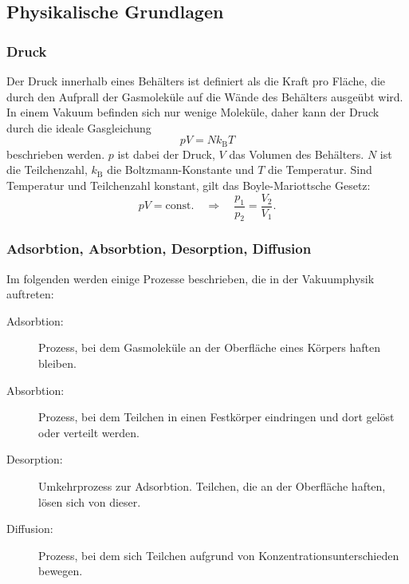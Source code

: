 \subsection{Physikalische Grundlagen}
\subsubsection{Druck}
Der Druck innerhalb eines Behälters ist definiert als die Kraft pro Fläche, die durch den Aufprall
der Gasmoleküle auf die Wände des Behälters ausgeübt wird. In einem Vakuum befinden sich nur wenige Moleküle, daher kann der Druck durch die ideale Gasgleichung
\begin{equation}
    \label{eq:id_gasgleichung}
    pV = N k_{\text{B}} T
\end{equation}
beschrieben werden. $p$ ist dabei der Druck, $V$ das Volumen des Behälters. $N$ ist die Teilchenzahl, $k_{\text{B}}$ die Boltzmann-Konstante und $T$ die Temperatur.
Sind Temperatur und Teilchenzahl konstant, gilt das Boyle-Mariottsche Gesetz:
\begin{equation}
    \label{eq:boyle_mariott}
    pV = \text{const.} \quad \Rightarrow \quad \frac{p_1}{p_2} = \frac{V_2}{V_1} .
\end{equation}
\cite{V070_glossar}
\subsubsection{Adsorbtion, Absorbtion, Desorption, Diffusion}
Im folgenden werden einige Prozesse beschrieben, die in der Vakuumphysik auftreten:
\begin{description}
    \item[Adsorbtion:] Prozess, bei dem Gasmoleküle an der Oberfläche eines Körpers haften bleiben.
    \item[Absorbtion:] Prozess, bei dem Teilchen in einen Festkörper eindringen und dort gelöst oder verteilt werden.
    \item[Desorption:] Umkehrprozess zur Adsorbtion. Teilchen, die an der Oberfläche haften, lösen sich von dieser.
    \item[Diffusion:] Prozess, bei dem sich Teilchen aufgrund von Konzentrationsunterschieden bewegen.
\end{description}
\cite{V070_glossar}
